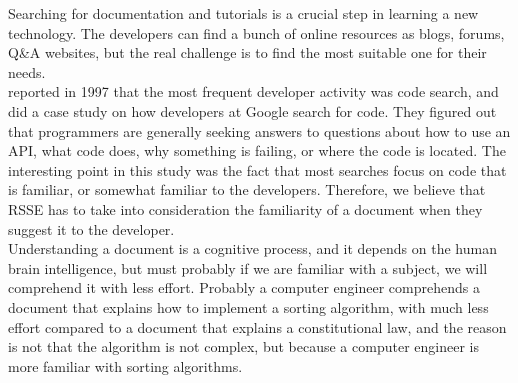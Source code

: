 \documentclass[12pt,mscthesis]{usiinfthesis}
\begin{document}
	Searching for documentation and tutorials is a crucial step in learning a new technology. The developers can find a bunch of online resources as blogs, forums, Q\&A websites, but the real challenge is to find the most suitable one for their needs.\\

	\citet{Singer-1997} reported in 1997 that the most frequent developer activity was code search, and \citet{Sadowski:2015} did a case study on how developers at Google search for code. They figured out that programmers are generally seeking answers to questions about how to use an API, what code does, why something is failing, or where the code is located. The interesting point in this study was the fact that most searches focus on code that is familiar, or somewhat familiar to the developers.
	Therefore, we believe that RSSE has to take into consideration the familiarity of a document when they suggest it to the developer. \\

	Understanding a document is a cognitive process, and it depends on the human brain intelligence, but must probably if we are familiar with a subject, we will comprehend it with less effort. Probably a computer engineer comprehends a document that explains how to implement a sorting algorithm, with much less effort compared to a document that explains a constitutional law, and the reason is not that the algorithm is not complex, but because a computer engineer is more familiar with sorting algorithms.\\
	
\end{document}

